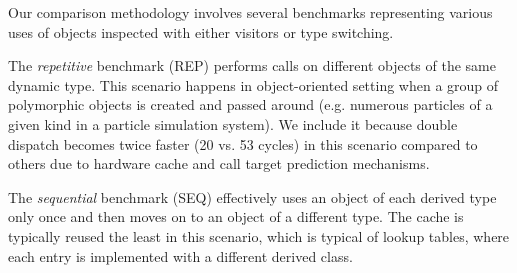
Our comparison methodology involves several benchmarks representing various 
uses of objects inspected with either visitors or type switching.

The \emph{repetitive} benchmark (REP) performs calls on different objects of the 
same dynamic type. This scenario happens in object-oriented setting when a 
group of polymorphic objects is created and passed around (e.g. numerous 
particles of a given kind in a particle simulation system). We include it 
because double dispatch becomes twice faster (20 vs. 53 cycles) in this 
scenario compared to others due to hardware cache and call target prediction mechanisms. 

The \emph{sequential} benchmark (SEQ) effectively uses an object of each derived type only 
once and then moves on to an object of a different type. The cache is typically 
reused the least in this scenario, which is typical of lookup tables, where each 
entry is implemented with a different derived class.

